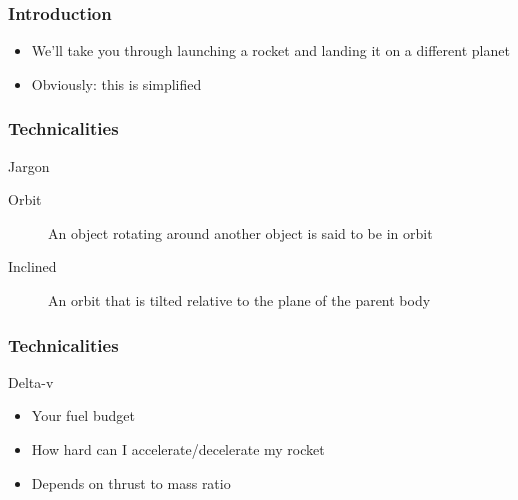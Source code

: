 \begin{frame}
    \frametitle{Introduction}
    \begin{block}{}
        \begin{itemize}
            \item We'll take you through launching a rocket and landing it on a different planet
            \item Obviously: this is simplified
        \end{itemize}
    \end{block}
\end{frame}
\begin{frame}
    \frametitle{Technicalities}
    \begin{block}{Jargon}
        \begin{description}
            \item [Orbit] An object rotating around another object is said to be in orbit
            \item [Inclined] An orbit that is tilted relative to the plane of the parent body
        \end{description}
    \end{block}
\end{frame}
\begin{frame}
    \frametitle{Technicalities}
    \begin{block}{Delta-v}
        \begin{itemize}
            \item Your fuel budget
            \item How hard can I accelerate/decelerate my rocket
            \item Depends on thrust to mass ratio
        \end{itemize}
    \end{block}
\end{frame}
